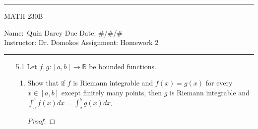 \documentclass[12pt]{article}
\theoremstyle{definition}
\begin{document}
    \thispagestyle{empty}\hrule

    \begin{center}
        \vspace{.4cm} { \large MATH 230B}
    \end{center}
    {Name:\ Quin Darcy \hspace{\fill} Due Date: \#/\#/\#   \\
    { Instructor:} Dr. Domokos \hspace{\fill} Assignment:
    Homework 2 \\ \hrule}

    \begin{enumerate}
        \item[5.1] Let $f, g:[a, b]\to\mathbb{R}$ be bounded functions. 
            \begin{enumerate}[label=(\arabic*)]
                \item Show that if $f$ is Riemann integrable and $f(x)=g(x)$
                    for every $x\in[a, b]$ except finitely many points, then
                    $g$ is Riemann integrable and
                    $\int_{a}^{b}f(x)dx=\int_{a}^{b}g(x)dx$.
                        \begin{proof}
                            
                        \end{proof}
            \end{enumerate}
    \end{enumerate}
\end{document}
